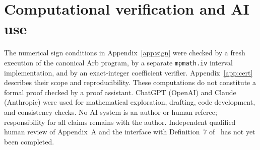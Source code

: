\documentclass[10pt,a4paper]{article}
\numberwithin{equation}{section}
\theoremstyle{remark}\newtheorem{remark}[theorem]{Remark}\newtheorem{question}[theorem]{Question}
\begin{document}
\section*{Computational verification and AI use}
The numerical sign conditions in Appendix~\ref{app:sign} were checked by a fresh execution of the canonical Arb program, by a separate \texttt{mpmath.iv} interval implementation, and by an exact-integer coefficient verifier. Appendix~\ref{app:cert} describes their scope and reproducibility. These computations do not constitute a formal proof checked by a proof assistant. ChatGPT (OpenAI) and Claude (Anthropic) were used for mathematical exploration, drafting, code development, and consistency checks. No AI system is an author or human referee; responsibility for all claims remains with the author. Independent qualified human review of Appendix~A and the interface with Definition~7 of~\cite{claude3sat} has not yet been completed.

\appendix
\end{document}

